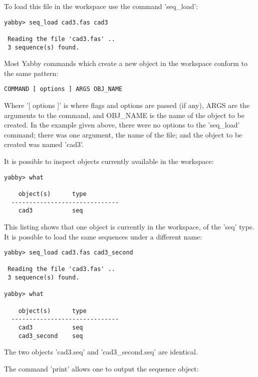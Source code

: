 
To load this file in the workspace use the command 'seq\_load':

\begin{verbatim}
yabby> seq_load cad3.fas cad3

 Reading the file 'cad3.fas' ..
 3 sequence(s) found.
\end{verbatim}

Most Yabby commands which create a new object in the workspace
conform to the same pattern:

\begin{verbatim}
COMMAND [ options ] ARGS OBJ_NAME
\end{verbatim}

Where '[ options ]' is where flags and options are passed (if
any), ARGS are the arguments to the command, and OBJ\_NAME is
the name of the object to be created. In the example given
above, there were no options to the 'seq\_load' command; there
was one argument, the name of the file; and the object to be
created was named 'cad3'.

It is possible to inspect objects currently available in the
workspace:


\begin{verbatim}
yabby> what

    object(s)      type
  ------------------------------
    cad3           seq           
\end{verbatim}

This listing shows that one object is currently in the workspace,
of the 'seq' type. It is possible to load the same sequences
under a different name: 

\begin{verbatim}
yabby> seq_load cad3.fas cad3_second

 Reading the file 'cad3.fas' ..
 3 sequence(s) found.

yabby> what

    object(s)      type
  ------------------------------
    cad3           seq           
    cad3_second    seq           
\end{verbatim}

The two objects 'cad3.seq' and 'cad3\_second.seq' are identical.


The command 'print' allows one to output the sequence object:

